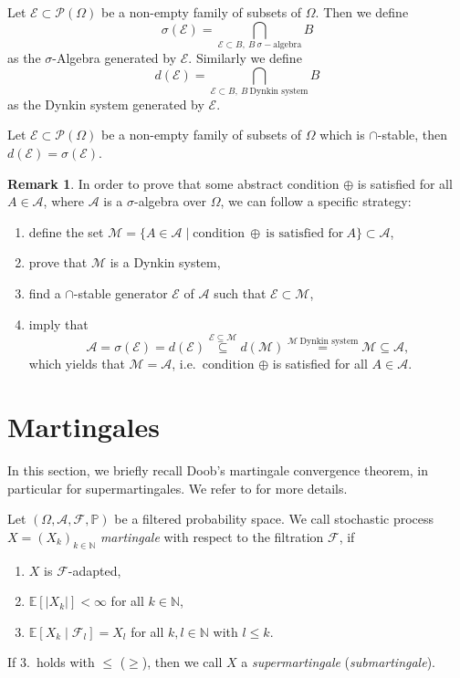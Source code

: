 \documentclass[12pt,openany]{book}
\theoremstyle{definition}
\newtheorem{remark}[thm]{Remark}
\theoremstyle{definition}
\newcommand{\cA}{\mathcal{A}}
\newcommand{\cE}{\mathcal{E}}
\newcommand{\cM}{\mathcal{M}}
\newcommand{\cP}{\mathcal{P}}
\newcommand{\E}{\mathbb{E}}
\newcommand{\N}{\mathbb{N}}
\begin{document}
\begin{defi}
Let $\cE\subset \cP(\Omega)$ be a non-empty family of subsets of $\Omega$. Then we define 
\[\sigma(\cE) = \bigcap\limits_{\cE\subset B,\ B\ \sigma-\text{algebra}} B \]
as the $\sigma$-Algebra generated by $\cE$. Similarly we define
\[ d(\cE) = \bigcap\limits_{\cE\subset B,\ B\ \text{Dynkin system}} B \]
as the Dynkin system generated by $\cE$.
\end{defi}

\begin{thm}\label{thm:monclass}
Let $\cE\subset \cP(\Omega)$ be a non-empty family of subsets of $\Omega$ which is $\cap$-stable, then $d(\cE)=\sigma(\cE)$.
\end{thm}

\begin{remark}\label{rem:monotoneclass}
In order to prove that some abstract condition $\oplus$ is satisfied for all $A\in\cA$, where $\cA$ is a $\sigma$-algebra over $\Omega$, we can follow a specific strategy:
\begin{enumerate}
\item define the set $\cM = \{A\in\cA\mid \text{condition}\ \oplus\ \text{is satisfied for}\ A\}\subset \cA$,
\item prove that $\cM$ is a Dynkin system,
\item find a $\cap$-stable generator $\cE$ of $\cA$ such that $\cE\subset \cM$,
\item imply that
\[\cA = \sigma(\cE) = d(\cE) \overset{\cE\subseteq \cM}{\subseteq} d(\cM) \overset{\cM\ \text{Dynkin system}}{=} \cM \subseteq \cA, \]
which yields that $\cM = \cA$, i.e.~condition $\oplus$ is satisfied for all $A\in\cA$.
\end{enumerate}
\end{remark}

\section{Martingales}\label{app:martingales}
In this section, we briefly recall Doob's martingale convergence theorem, in particular for supermartingales. We refer to \cite[Section~9--11]{klenke} for more details.
\begin{defi}
Let $(\Omega,\mathcal A,\mathcal F,\mathbb P)$ be a filtered probability space. We call stochastic process $X=(X_k)_{k\in\N}$ \textit{martingale} with respect to the filtration $\mathcal F$, if
\begin{enumerate}
\item $X$ is $\mathcal F$-adapted,
\item $\E[|X_k|]<\infty$ for all $k\in\N$,
\item $\E[X_k\mid \mathcal F_l] = X_l$ for all $k,l\in\N$ with $l\le k$. 
\end{enumerate}
If 3.~holds with $\le$ ($\ge$), then we call $X$ a \textit{supermartingale} (\textit{submartingale}).
\end{defi}
\end{document}
